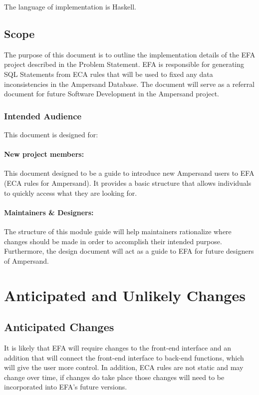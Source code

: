 \documentclass[12pt]{article}
\begin{document}
The language of implementation is Haskell.

\subsection{Scope}
The purpose of this document is to outline the implementation details of the EFA project described in the Problem Statement.
EFA is responsible for generating SQL Statements from ECA rules that will 
be used to fixed any data inconsistencies in the Ampersand Database. 
The document will serve as a referral document for future Software Development in the Ampersand project.

\subsubsection{Intended Audience}
This document is designed for:
\paragraph{New project members:}
This document designed to be a guide to introduce new Ampersand users to EFA 
(ECA rules for Ampersand). It provides a basic structure that allows 
individuals to quickly access what they are looking for.
   
\paragraph{Maintainers \& Designers:} The structure of this module guide will 
help maintainers rationalize where changes should be made in order to 
accomplish their intended purpose. Furthermore, the design document will act as 
a guide to EFA for future designers of Ampersand.

\section{Anticipated and Unlikely Changes}
\subsection{Anticipated Changes}
It is likely that EFA will require changes to the front-end interface and an 
addition that will connect the front-end interface to back-end functions, which 
will give the user more control. In addition, ECA rules are not static and may 
change over time, if changes do take place those changes will need to be 
incorporated into EFA's future versions. 
\end{document}
